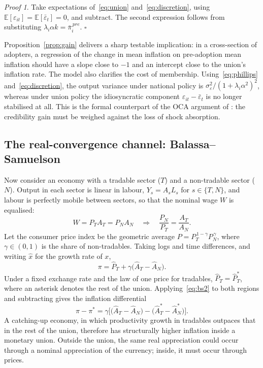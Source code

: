 \documentclass[11pt,a4paper]{article}
\numberwithin{equation}{section}
\theoremstyle{definition}
\theoremstyle{remark}
\newtheorem*{proof*}{Proof}
\begin{document}
\begin{proof*}
Take expectations of~\eqref{eq:union} and~\eqref{eq:discretion}, using $\mathbb{E}[\varepsilon_{it}]=\mathbb{E}[\bar{\varepsilon}_t]=0$, and subtract. The second expression follows from substituting $\lambda_i\alpha k=\bar{\pi}_i^{\,pre}$. \hfill$\square$
\end{proof*}

Proposition~\ref{prop:gain} delivers a sharp testable implication: in a cross-section of adopters, a regression of the change in mean inflation on pre-adoption mean inflation should have a slope close to $-1$ and an intercept close to the union's inflation rate. The model also clarifies the cost of membership. Using~\eqref{eq:phillips} and~\eqref{eq:discretion}, the output variance under national policy is $\sigma^2_\varepsilon/(1+\lambda_i\alpha^2)^2$, whereas under union policy the idiosyncratic component $\varepsilon_{it}-\bar{\varepsilon}_t$ is no longer stabilised at all. This is the formal counterpart of the OCA argument of \citet{mundell1961}: the credibility gain must be weighed against the loss of shock absorption.

\subsection{The real-convergence channel: Balassa--Samuelson}
Now consider an economy with a tradable sector ($T$) and a non-tradable sector ($N$). Output in each sector is linear in labour, $Y_s = A_s L_s$ for $s\in\{T,N\}$, and labour is perfectly mobile between sectors, so that the nominal wage $W$ is equalised:
\begin{equation}
W = P_T A_T = P_N A_N
\quad\Longrightarrow\quad
\frac{P_N}{P_T} = \frac{A_T}{A_N}.
\label{eq:bs1}
\end{equation}
Let the consumer price index be the geometric average $P = P_T^{\,1-\gamma}P_N^{\,\gamma}$, where $\gamma\in(0,1)$ is the share of non-tradables. Taking logs and time differences, and writing $\hat{x}$ for the growth rate of $x$,
\begin{equation}
\pi = \hat{P}_T + \gamma\big(\hat{A}_T - \hat{A}_N\big).
\label{eq:bs2}
\end{equation}
Under a fixed exchange rate and the law of one price for tradables, $\hat{P}_T = \hat{P}_T^{*}$, where an asterisk denotes the rest of the union. Applying~\eqref{eq:bs2} to both regions and subtracting gives the inflation differential
\begin{equation}
\pi - \pi^{*} = \gamma\Big[\big(\hat{A}_T - \hat{A}_N\big) - \big(\hat{A}_T^{*} - \hat{A}_N^{*}\big)\Big].
\label{eq:bs3}
\end{equation}
A catching-up economy, in which productivity growth in tradables outpaces that in the rest of the union, therefore has structurally higher inflation inside a monetary union. Outside the union, the same real appreciation could occur through a nominal appreciation of the currency; inside, it must occur through prices.
\end{document}
